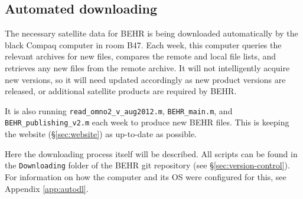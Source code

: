 \documentclass[12pt]{article}
\begin{document}
	\subsection{Automated downloading}
	
		The necessary satellite data for BEHR is being downloaded automatically by the black Compaq computer in room B47. Each week, this computer queries the relevant archives for new files, compares the remote and local file lists, and retrieves any new files from the remote archive.  It will not intelligently acquire new versions, so it will need updated accordingly as new product versions are released, or additional satellite products are required by BEHR.
		
		It is also running \lstinline$read_omno2_v_aug2012.m$, \lstinline$BEHR_main.m$, and \lstinline$BEHR_publishing_v2.m$ each week to produce new BEHR files. This is keeping the website (\S\ref{sec:website}) as up-to-date as possible.
		
		Here the downloading process itself will be described. All scripts can be found in the \texttt{Downloading} folder of the BEHR git repository (see \S\ref{sec:version-control}).  For information on how the computer and its OS were configured for this, see Appendix \ref{app:autodl}.
		
\end{document}
